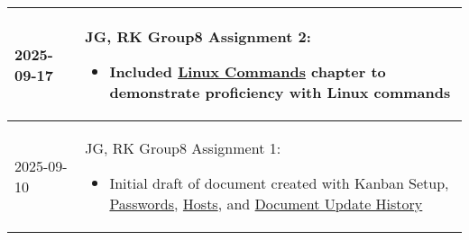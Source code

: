 \begin{longtable}{|l||p{13.5cm}|}
2025-09-17 & JG, RK Group8 Assignment 2:
\begin{itemize}[topsep=0pt,itemsep=0pt,parsep=0pt,partopsep=0pt,leftmargin=12pt]
\item Included \hyperref[ch:linux]{Linux Commands} chapter to demonstrate proficiency with Linux commands
\end{itemize} 
\\ \hline

2025-09-10 & JG, RK Group8 Assignment 1:
\begin{itemize}[topsep=0pt,itemsep=0pt,parsep=0pt,partopsep=0pt,leftmargin=12pt]
\item Initial draft of document created with Kanban Setup, \hyperref[ch:passwords]{Passwords}, \hyperref[ch:hosts]{Hosts}, and \hyperref[Table::UpdateHistory]{Document Update History}
\end{itemize} 
\\ \hline

\end{longtable}


